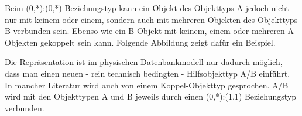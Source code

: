         Beim (0,*):(0,*) Beziehungstyp kann ein Objekt des Objekttyps A jedoch nicht nur mit keinem oder einem, sondern auch mit mehreren Objekten des Objekttyps B verbunden sein. Ebenso wie ein B-Objekt mit keinem, einem oder mehreren A-Objekten gekoppelt sein kann. Folgende Abbildung zeigt dafür ein Beispiel.
        \begin{center}
        \end{center}
        Die Repräsentation ist im physischen Datenbankmodell nur dadurch möglich, dass man einen neuen - rein technisch bedingten - Hilfsobjekttyp A/B einführt. In mancher Literatur wird auch von einem Koppel-Objekttyp gesprochen. A/B wird mit den Objekttypen A und B jeweils durch einen (0,*):(1,1) Beziehungstyp verbunden.
